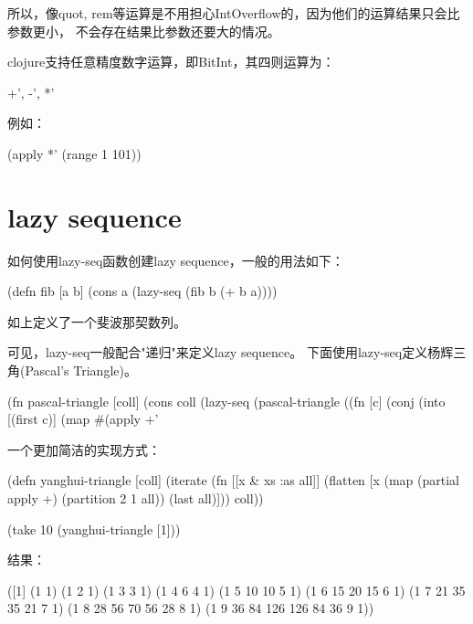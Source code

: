 ﻿\documentclass[a4paper,11pt]{article}
\begin{document}
  所以，像quot, rem等运算是不用担心IntOverflow的，因为他们的运算结果只会比参数更小，
  不会存在结果比参数还要大的情况。

  clojure支持任意精度数字运算，即BitInt，其四则运算为：\par
  \begin{schemecode}
    +', -', *'
  \end{schemecode}

  例如：\par
  \begin{schemecode}
    (apply *' (range 1 101))
  \end{schemecode}

  \section[lazy sequence]{lazy sequence}
  如何使用lazy-seq函数创建lazy sequence，一般的用法如下：\par
  \begin{schemecode}
    (defn fib
      [a b]
      (cons a (lazy-seq (fib b (+ b a))))
  \end{schemecode}

  如上定义了一个斐波那契数列。

  可见，lazy-seq一般配合"递归"来定义lazy sequence。
  下面使用lazy-seq定义杨辉三角(Pascal's Triangle)。

  \begin{schemecode}
(fn pascal-triangle
  [coll]
  (cons coll (lazy-seq (pascal-triangle ((fn [c]
        (conj (into [(first c)]
          (map #(apply +' %
  \end{schemecode}

  一个更加简洁的实现方式：\par
  \begin{schemecode}
(defn yanghui-triangle
  [coll]
  (iterate
   (fn [[x & xs :as all]]
     (flatten
      [x (map (partial apply +)
              (partition 2 1 all)) (last all)]))
   coll))

(take 10 (yanghui-triangle [1]))
  \end{schemecode}

  结果：\par
  \begin{schemecode}
([1]
 (1 1)
 (1 2 1)
 (1 3 3 1)
 (1 4 6 4 1)
 (1 5 10 10 5 1)
 (1 6 15 20 15 6 1)
 (1 7 21 35 35 21 7 1)
 (1 8 28 56 70 56 28 8 1)
 (1 9 36 84 126 126 84 36 9 1))
  \end{schemecode}
\end{document}
